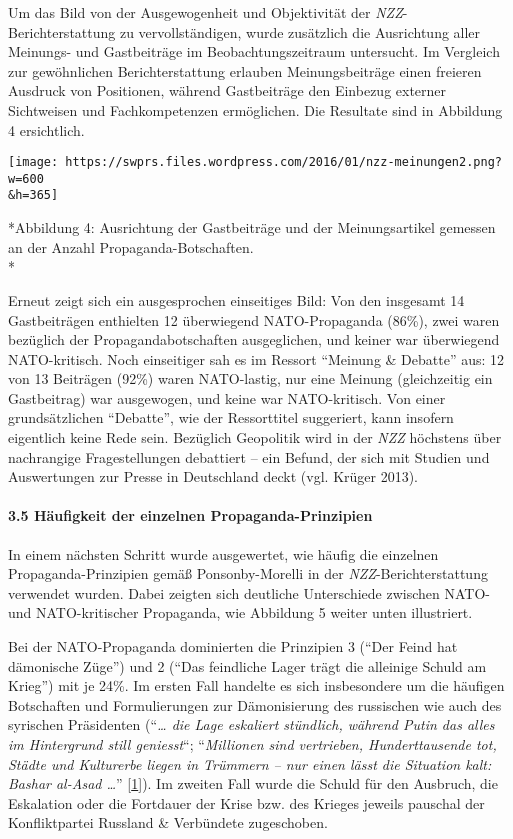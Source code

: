 Um das Bild von der Ausgewogenheit und Objektivität der
\emph{NZZ}-Berichterstattung zu vervollständigen, wurde zusätzlich die
Ausrichtung aller Meinungs- und Gastbeiträge im Beobachtungszeitraum
untersucht. Im Vergleich zur gewöhnlichen Berichterstattung erlauben
Meinungsbeiträge einen freieren Ausdruck von Positionen, während
Gastbeiträge den Einbezug externer Sichtweisen und Fachkompetenzen
ermöglichen. Die Resultate sind in Abbildung 4 ersichtlich.

\texttt{[image: https://swprs.files.wordpress.com/2016/01/nzz-meinungen2.png?w=600\\\&h=365]}

*Abbildung 4: Ausrichtung der Gastbeiträge und der Meinungsartikel
gemessen an der Anzahl Propaganda-Botschaften.\\
*

Erneut zeigt sich ein ausgesprochen einseitiges Bild: Von den insgesamt
14 Gastbeiträgen enthielten 12 überwiegend NATO-Propaganda (86\%), zwei
waren bezüglich der Propaganda­botschaften ausgeglichen, und keiner war
überwiegend NATO-kritisch. Noch einseitiger sah es im Ressort ``Meinung
\& Debatte'' aus: 12 von 13 Beiträgen (92\%) waren NATO-lastig, nur eine
Meinung (gleichzeitig ein Gastbeitrag) war ausgewogen, und keine war
NATO-kritisch. Von einer grundsätzlichen ``Debatte'', wie der
Ressorttitel suggeriert, kann insofern eigentlich keine Rede sein.
Bezüglich Geopolitik wird in der \emph{NZZ} höchstens über nachrangige
Fragestellungen debattiert -- ein Befund, der sich mit Studien und
Auswertungen zur Presse in Deutschland deckt (vgl. Krüger 2013).

\hypertarget{35-huxe4ufigkeit-der-einzelnen-propaganda-prinzipien}{%
\paragraph{3.5 Häufigkeit der einzelnen
Propaganda-Prinzipien}\label{35-huxe4ufigkeit-der-einzelnen-propaganda-prinzipien}}

In einem nächsten Schritt wurde ausgewertet, wie häufig die einzelnen
Propaganda-Prinzipien gemäß Ponsonby-Morelli in der
\emph{NZZ}-Bericht­erstattung verwendet wurden. Dabei zeigten sich
deutliche Unterschiede zwischen NATO- und NATO-kritischer Propaganda,
wie Abbildung 5 weiter unten illustriert.

Bei der NATO-Propaganda dominierten die Prinzipien 3 (``Der Feind hat
dämonische Züge'') und 2 (``Das feindliche Lager trägt die alleinige
Schuld am Krieg'') mit je 24\%. Im ersten Fall handelte es sich
insbesondere um die häufigen Botschaften und Formulierungen zur
Dämonisierung des russischen wie auch des syrischen Präsidenten
(``\emph{\ldots{} die Lage eskaliert stündlich, während Putin das alles
im Hintergrund still geniesst}``; ``\emph{Millionen sind vertrieben,
Hunderttausende tot, Städte und Kulturerbe liegen in Trümmern -- nur
einen lässt die Situation kalt: Bashar al-Asad \ldots{}}''
{[}\protect\hyperlink{anm1}{1}{]}). Im zweiten Fall wurde die Schuld für
den Ausbruch, die Eskalation oder die Fortdauer der Krise bzw. des
Krieges jeweils pauschal der Konfliktpartei Russland \& Verbündete
zugeschoben.

